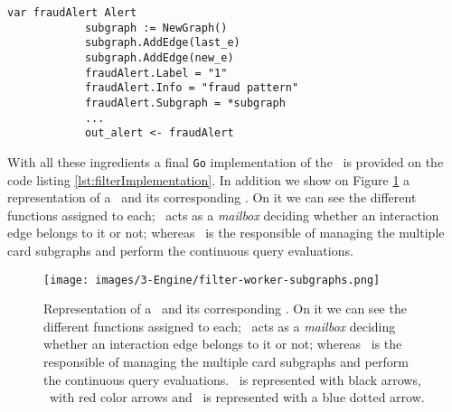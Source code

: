 \begin{itemize}
    \begin{center}
    \lstset{style=golangStyle}
    \begin{lstlisting}[caption={Possible implementation of $\text{emitAlert}(\mathsf{e_{last}}, \mathsf{e_{new}})$}, label={lst:emitAlertImpl}]
            var fraudAlert Alert 
            subgraph := NewGraph()
            subgraph.AddEdge(last_e)
            subgraph.AddEdge(new_e)
            fraudAlert.Label = "1"
            fraudAlert.Info = "fraud pattern"
            fraudAlert.Subgraph = *subgraph
            ...
            out_alert <- fraudAlert
    \end{lstlisting}
    \end{center}
\end{itemize}

With all these ingredients a final \texttt{Go} implementation of the \filter\ is provided on the code listing \ref{lst:filterImplementation}. In addition we show on Figure \ref{img:filterworker-subgraphs} a representation of a \filter\ and its corresponding \filterworker. On it we can see the different functions assigned to each; \filter\ acts as a \textit{mailbox} deciding whether an interaction edge belongs to it or not; whereas \filterworker\ is the responsible of managing the multiple card subgraphs and perform the continuous query evaluations. 

\begin{figure}[p]
  \centering
  \hspace*{-0.6cm}
  \texttt{[image: images/3-Engine/filter-worker-subgraphs.png]}
  \caption{Representation of a \filter\ and its corresponding \filterworker. On it we can see the different functions assigned to each; \filter\ acts as a \textit{mailbox} deciding whether an interaction edge belongs to it or not; whereas \filterworker\ is the responsible of managing the multiple card subgraphs and perform the continuous query evaluations. \eventch\ is represented with black arrows, \alertch\ with red color arrows and \internaledgech\ is represented with a blue dotted arrow.}
  \label{img:filterworker-subgraphs}
\end{figure}

